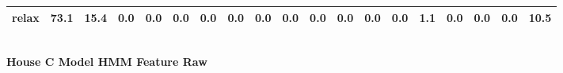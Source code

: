 \documentclass{article}
\begin{document}
\begin{sideways}
\begin{tabular}{lrrrrrrrrrrrrrrrrrr}
relax                         &        73.1 &               15.4 &           0.0 &                          0.0 &                0.0 &                0.0 &                        0.0 &          0.0 &              0.0 &                0.0 &                    0.0 &                      0.0 &                  0.0 &                   1.1 &              0.0 &              0.0 &                                  0.0 &         10.5 \\
\bottomrule
\end{tabular}
\end{sideways}
\normalsize
\vspace{1cm}\\
\textbf{House C Model HMM Feature Raw}\\
\vspace{1cm}\\
\end{document}
